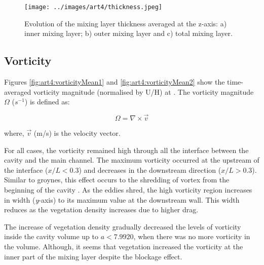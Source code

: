 \begin{figure}[!htb]
\centering
\texttt{[image: ../images/art4/thickness.jpeg]}
\caption{Evolution of the mixing layer thickness averaged at the z-axis: a) inner mixing layer; b) outer mixing layer and c) total mixing layer.}
\label{fig:art4:thickness}
\end{figure}
\FloatBarrier
\subsection{Vorticity}
Figures \ref{fig:art4:vorticityMean1} and \ref{fig:art4:vorticityMean2} show the time-averaged vorticity magnitude (normalised by U/H) at . The vorticity magnitude $\Omega$ ($s^{-1}$) is defined as:

\begin{equation}
\Omega = \nabla \times \vec{v}
\label{eqn:art4:vorticity}
\end{equation}

where, $\vec{v}$ (m/s) is the velocity vector.

For all cases, the vorticity remained high through all the interface between the cavity and the main channel. The maximum vorticity occurred at the upstream of the interface ($x/L<0.3$) and decreases in the downstream direction ($x/L>0.3$). Similar to groynes, this effect occurs to the shredding of vortex from the beginning of the cavity \textcite{xiang2020}. As the eddies shred, the high vorticity region increases in width (\textit{y}-axis) to its maximum value at the downstream wall. This width reduces as the vegetation density increases due to higher drag.

The increase of vegetation density gradually decreased the levels of vorticity inside the cavity volume up to $a<7.9920$, when there was no more vorticity in the volume. Although, it seems that vegetation increased the vorticity at the inner part of the mixing layer despite the blockage effect.


